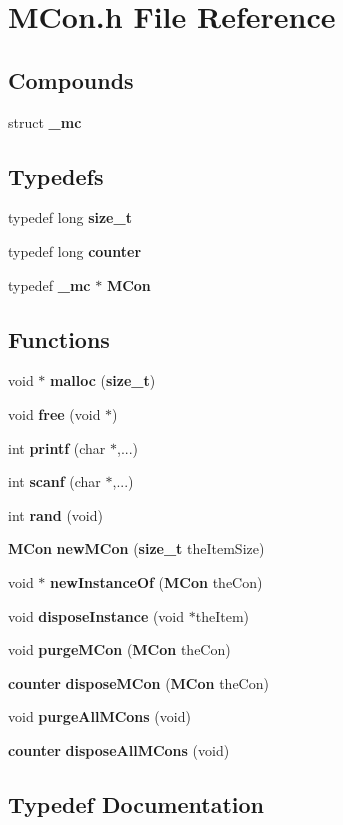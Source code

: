 \section{MCon.h File Reference}
\label{MCon_8h}
\subsection*{Compounds}
\begin{CompactItemize}
\item 
struct {\bf \_\-mc}
\end{CompactItemize}
\subsection*{Typedefs}
\begin{CompactItemize}
\item 
typedef long {\bf size\_\-t}
\item 
typedef long {\bf counter}
\item 
typedef {\bf \_\-mc} $\ast$ {\bf MCon}
\end{CompactItemize}
\subsection*{Functions}
\begin{CompactItemize}
\item 
void $\ast$ {\bf malloc} ({\bf size\_\-t})
\item 
void {\bf free} (void $\ast$)
\item 
int {\bf printf} (char $\ast$,...)
\item 
int {\bf scanf} (char $\ast$,...)
\item 
int {\bf rand} (void)
\item 
{\bf MCon} {\bf new\-MCon} ({\bf size\_\-t} the\-Item\-Size)
\item 
void $\ast$ {\bf new\-Instance\-Of} ({\bf MCon} the\-Con)
\item 
void {\bf dispose\-Instance} (void $\ast$the\-Item)
\item 
void {\bf purge\-MCon} ({\bf MCon} the\-Con)
\item 
{\bf counter} {\bf dispose\-MCon} ({\bf MCon} the\-Con)
\item 
void {\bf purge\-All\-MCons} (void)
\item 
{\bf counter} {\bf dispose\-All\-MCons} (void)
\end{CompactItemize}


\subsection{Typedef Documentation}
